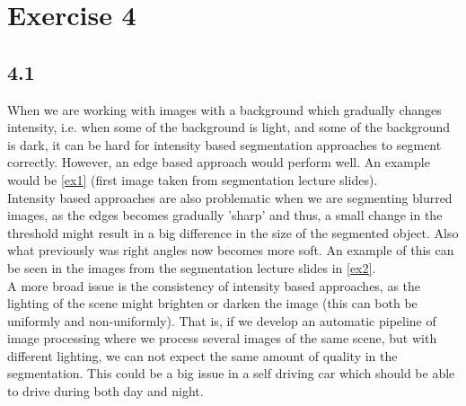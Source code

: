 \section{Exercise 4}
\subsection*{4.1}
When we are working with images with a background which gradually changes intensity, i.e. when some of the background is light, and some of the background is dark, it can be hard for intensity based segmentation approaches to segment correctly. However, an edge based approach would perform well. An example would be \autoref{ex1} (first image taken from segmentation lecture slides).\\
Intensity based approaches are also problematic when we are segmenting blurred images, as the edges becomes gradually 'sharp' and thus, a small change in the threshold might result in a big difference in the size of the segmented object. Also what previously was right angles now becomes more soft. An example of this can be seen in the images from the segmentation lecture slides in \autoref{ex2}.\\
A more broad issue is the consistency of intensity based approaches, as the lighting of the scene might brighten or darken the image (this can both be uniformly and non-uniformly). That is, if we develop an automatic pipeline of image processing where we process several images of the same scene, but with different lighting, we can not expect the same amount of quality in the segmentation. This could be a big issue in a self driving car which should be able to drive during both day and night.

